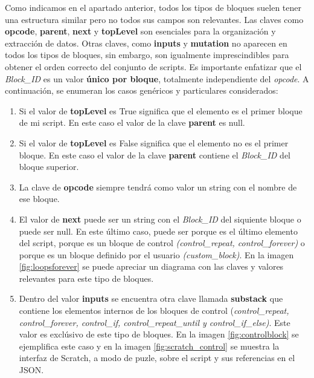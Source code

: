 \documentclass[a4paper, 12pt]{book}
\begin{document}
\newpage 
Como indicamos en el apartado anterior, todos los tipos de bloques suelen tener una estructura similar pero no todos sus campos son relevantes. Las claves como \textbf{opcode}, \textbf{parent}, \textbf{next} y \textbf{topLevel} son esenciales para la organización y extracción de datos. Otras claves, como \textbf{inputs} y \textbf{mutation} no aparecen en todos los tipos de bloques, sin embargo, son igualmente imprescindibles para obtener el orden correcto del conjunto de scripts. Es importante enfatizar que el \textit{Block\_ID} es un valor \textbf{único por bloque}, totalmente independiente del \textit{opcode}. A continuación, se enumeran los casos genéricos y particulares considerados:

\begin{enumerate}

\item Si el valor de \textbf{topLevel} es True significa que el elemento es el primer bloque de mi script. En este caso el valor de la clave \textbf{parent} es null. 

\item Si el valor de \textbf{topLevel} es False significa que el elemento no es el primer bloque. En este caso el valor de la clave \textbf{parent} contiene el \textit{Block\_ID} del bloque superior.

\item La clave de \textbf{opcode} siempre tendrá como valor un string con el nombre de ese bloque.


\item El valor de \textbf{next} puede ser un string con el \textit{Block\_ID} del siquiente bloque o puede ser null. En este último caso, puede ser porque es el último elemento del script, porque es un bloque de control \textit{(control\_repeat, control\_forever)} o porque es un bloque definido por el usuario \textit{(custom\_block)}. En la imagen \ref{fig:loopsforever} se puede apreciar un diagrama con las claves y valores relevantes para este tipo de bloques.

\item Dentro del valor \textbf{inputs} se encuentra otra clave llamada \textbf{substack} que contiene los elementos internos de los bloques de control (\textit{control\_repeat, control\_forever, control\_if, control\_repeat\_until y control\_if\_else)}. Este valor es exclúsivo de este tipo de bloques. En la imagen \ref{fig:controlblock} se ejemplifica este caso y en la imagen \ref{fig:scratch_control} se muestra la interfaz de Scratch, a modo de puzle, sobre el script y sus referencias en el JSON.


\end{enumerate}
\end{document}
